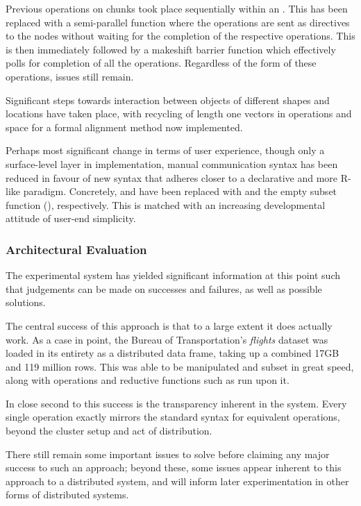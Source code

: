 Previous operations on chunks took place sequentially within an .
This has been replaced with a semi-parallel function where the operations are sent as directives to the nodes without waiting for the completion of the respective operations.
This is then immediately followed by a makeshift barrier function which effectively polls for completion of all the operations.
Regardless of the form of these operations, issues still remain.

Significant steps towards interaction between objects of different shapes and locations have taken place, with recycling of length one vectors in operations and space for a formal alignment method now implemented.

Perhaps most significant change in terms of user experience, though only a surface-level layer in implementation, manual communication syntax has been reduced in favour of new syntax that adheres closer to a declarative and more R-like paradigm.
Concretely,  and  have been replaced with  and the empty subset function (), respectively.
This is matched with an increasing developmental attitude of user-end simplicity.

\subsubsection{Architectural Evaluation}\label{sec:eval}

The experimental system has yielded significant information at this point such that judgements can be made on successes and failures, as well as possible solutions.

The central success of this approach is that to a large extent it does actually work.
As a case in point, the Bureau of Transportation's \emph{flights} \cite{bot2009flights} dataset was loaded in its entirety as a distributed data frame, taking up a combined 17GB and 119 million rows.
This was able to be manipulated and subset in great speed, along with operations and reductive functions such as  run upon it.

In close second to this success is the transparency inherent in the system.
Every single operation exactly mirrors the standard \R{} syntax for equivalent operations, beyond the cluster setup and act of distribution.

There still remain some important issues to solve before claiming any major success to such an approach; beyond these, some issues appear inherent to this approach to a distributed system, and will inform later experimentation in other forms of distributed systems.

